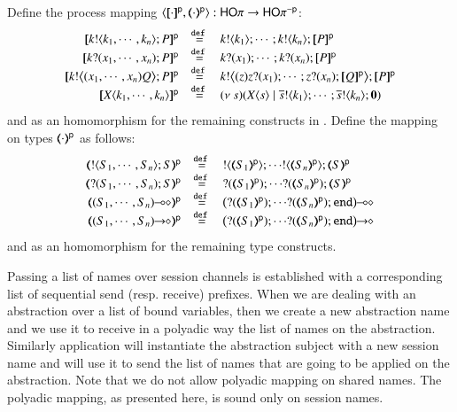 \begin{definition}\rm
	Define the process mapping $\encod{\cdot}{\cdot}{\mathsf{p}}: \HOp \to \HOp^{-\mathsf{p}}$:
\[
	\begin{array}{rcl}
		\map{\bout{k}{k_1, \cdots, k_n} P}^{\mathsf{p}}
		&\defeq&
		\bout{k}{k_1} \cdots ;  \bout{k}{k_n} \map{P}^{\mathsf{p}}
		\\

		\map{\binp{k}{x_1, \cdots, x_n} P}^{\mathsf{p}}
		&\defeq&
		\binp{k}{x_1} \cdots ; \binp{k}{x_n}  \map{P}^{\mathsf{p}}
		\\

		\map{\bbout{k}{\abs{x_1, \cdots, x_n} Q} P}^{\mathsf{p}}
		&\defeq&
		\bbout{k}{\abs{z}\binp{z}{x_1} \cdots ; \binp{z}{x_n} \map{Q}^{\mathsf{p}}} \map{P}^{\mathsf{p}}
		\\

		\map{\appl{X}{k_1, \cdots, k_n}}^{\mathsf{p}}
		&\defeq&
		\newsp{s}{\appl{X}{s} \Par \bout{\dual{s}}{k_1} \cdots ; \bout{\dual{s}}{k_n} \inact} 
	\end{array}
	\]
	and as an homomorphism for the remaining constructs in \HOp. 
	Define the mapping on types $(\!\!\langle\cdot\rangle\!\!)^\mathsf{p}$ as follows:
\[
	\begin{array}{rcl}
		\tmap{\btout{S_1, \cdots, S_n}S}{\mathsf{p}}
		&\defeq&
		\btout{\tmap{S_1}{\mathsf{p}}} \cdots \btout{\tmap{S_n}{\mathsf{p}}}\tmap{S}{\mathsf{p}}
		\\
		\tmap{\btinp{S_1, \cdots, S_n}S}{\mathsf{p}}
		&\defeq&
		\btinp{\tmap{S_1}{\mathsf{p}}} \cdots \btinp{\tmap{S_n}{\mathsf{p}}}\tmap{S}{\mathsf{p}}
		\\
		\tmap{\lhot{(S_1, \cdots, S_n)}}{\mathsf{p}}
		&\defeq&
		\lhot{\big(\btinp{\tmap{S_1}{\mathsf{p}}} \cdots \btinp{\tmap{S_n}{\mathsf{p}}}\tinact\big)}
		\\
		\tmap{\shot{(S_1, \cdots, S_n)}}{\mathsf{p}}
		&\defeq&
		\shot{\big(\btinp{\tmap{S_1}{\mathsf{p}}} \cdots \btinp{\tmap{S_n}{\mathsf{p}}}\tinact\big)}
	\end{array}
\]
	and as an homomorphism for the remaining type constructs.
\end{definition}
%
Passing a list of names over session channels is established
with a corresponding list of sequential send (resp. receive) prefixes.
When we are dealing with an abstraction over a list of bound variables,
then we create a new abstraction name and we use it to receive in a polyadic
way the list of names on the abstraction. Similarly application will instantiate
the abstraction subject with a new session name and will use it 
to send the list of names that are going to be applied on the abstraction.
Note that we do not allow polyadic mapping on shared names.
The polyadic mapping, as presented here, is sound only on session names.

